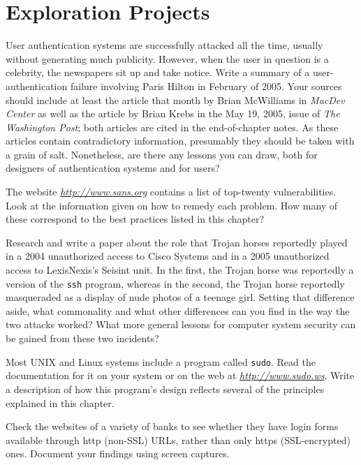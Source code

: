 \section*{Exploration Projects}
\begin{chapterEnumerate}

\item\label{paris-hilton-project}
User authentication systems are successfully attacked all the time,
usually without generating much publicity.  However, when the user in
question is a celebrity, the newspapers sit up and take notice.  Write
a summary of a user-authentication failure involving Paris Hilton in
February of 2005.  Your sources should include at least the article that
month by Brian McWilliams in \textit{MacDev Center} as well as the
article by Brian Krebs in the May 19, 2005, issue
of \textit{The Washington Post}; both articles are cited in the
end-of-chapter notes.  As these articles contain contradictory
information, presumably they should be taken with a grain of salt.
Nonetheless, are there any lessons you can draw, both for designers of authentication systems and
for users?

\item
The website \textit{\url{http://www.sans.org}} contains a list of top-twenty vulnerabilities.  Look at the information
given on how to remedy each problem.  How many of these correspond to
the best practices listed in this chapter?

\item
Research and write a paper about the role that Trojan horses
reportedly played in a 2004 unauthorized access to Cisco Systems and
in a 2005 unauthorized access to LexisNexis's Seisint unit.  In the
first, the Trojan horse was reportedly a version of the {\tt ssh}
program, whereas in the second, the Trojan horse reportedly
masqueraded as a display of nude photos of a teenage girl.  Setting
that difference aside, what commonality and what other differences can
you find in the way the two attacks worked?  What more general lessons
for computer system security can be gained from these two incidents?

\item
Most UNIX and Linux systems include a program called {\tt sudo}.  Read
the documentation for it on your system or on the web at
\textit{\url{http://www.sudo.ws}}.  Write a description of how this
program's design reflects several of the principles explained
in this chapter.

\item
Check the websites of a variety of banks to see whether they have login forms available through http (non-SSL) URLs, rather than only https (SSL-encrypted) ones.  Document your findings using screen captures.


\end{chapterEnumerate}
